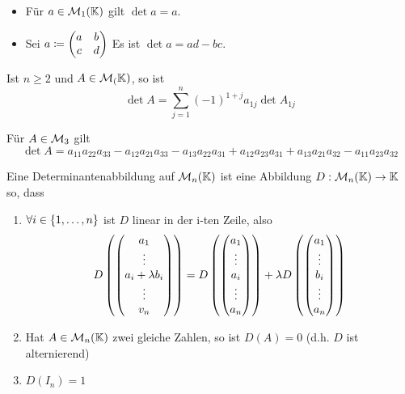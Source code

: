 \newcommand{\vol}[1]{\ensuremath{\txt{vol}\left(#1\right)}}
\begin{definition}
    \begin{itemize}
        \item Für $a \in \mathcal{M}_1 (\mathbb{K})$ gilt $\det a = a$.
        \item Sei $a \coloneqq \begin{pmatrix}a&b\\c&d\end{pmatrix}$ Es ist $\det a = ad-bc$. 
    \end{itemize}
\end{definition}
\begin{definition}
    Ist $n\geq 2$ und $A\in \mathcal{M}_(\mathbb{K})$, so ist \[
        \det A = \sum_{j=1}^n (-1)^{1+j} a_{1j}\det A_{1j}\]    
\end{definition}
\begin{definition}
    Für $A\in \mathcal{M}_3$ gilt \[
        \det A = a_{11}a_{22}a_{33} - a_{12}a_{21}a_{33} - a_{13}a_{22}a_{31} + 
        a_{12}a_{23}a_{31} + a_{13}a_{21}a_{32} - a_{11}a_{23}a_{32}\]
\end{definition}
\begin{definition}[Determinantenabbildung]
    Eine Determinantenabbildung auf $\mathcal{M}_{n}(\mathbb{K})$ ist eine Abbildung $D:\mathcal{M}_{n}(\mathbb{K})
    \to \mathbb{K}$ so, dass\begin{enumerate}
        \item $\forall i \in \left\{ 1,\dots, n \right\}$ ist $D$ linear in der i-ten Zeile,
        also \[
            D\left(\begin{pmatrix}a_1\\\vdots\\a_i+\lambda b_i\\\vdots\\v_n\end{pmatrix}\right) = 
            D\left(\begin{pmatrix}a_1\\\vdots\\a_i\\\vdots\\a_n\end{pmatrix}\right) + \lambda D\left(\begin{pmatrix}
                a_1\\\vdots\\b_i\\\vdots\\a_n
            \end{pmatrix}\right)\]
        \item Hat $A\in \mathcal{M}_{n}(\mathbb{K})$ zwei gleiche Zahlen, so ist $D(A) = 0$ (d.h.
        $D$ ist alternierend) 
        \item $D(I_n) = 1$
    \end{enumerate}    
\end{definition}
